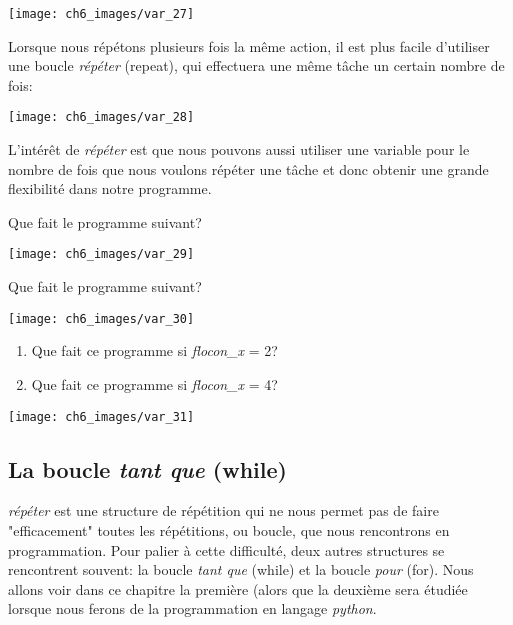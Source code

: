 \documentclass[11pt, a4paper]{book}
\begin{document}
\begin{center}
\texttt{[image: ch6\_images/var\_27]}
\end{center}

Lorsque nous répétons plusieurs fois la même action, il est plus facile d'utiliser une boucle {\it répéter} (repeat), qui effectuera une même tâche un certain nombre de fois:

\begin{center}
\texttt{[image: ch6\_images/var\_28]}
\end{center}

L'intérêt de {\it répéter} est que nous pouvons aussi utiliser une variable pour le nombre de fois que nous voulons répéter une tâche et donc obtenir une grande flexibilité dans notre programme.

\begin{exercice}
Que fait le programme suivant?
\begin{center}
\texttt{[image: ch6\_images/var\_29]}
\end{center}
\end{exercice}


\begin{exercice}
Que fait le programme suivant?
\begin{center}
\texttt{[image: ch6\_images/var\_30]}
\end{center}
\end{exercice}


\begin{exercice}
\begin{enumerate}
\item Que fait ce programme si {\it flocon\_x} = 2?
\item Que fait ce programme si {\it flocon\_x} = 4?
\end{enumerate}
\begin{center}
\texttt{[image: ch6\_images/var\_31]}
\end{center}
\end{exercice}

\subsection{La boucle {\it tant que} (while)}

{\it répéter} est une structure de répétition qui ne nous permet pas de faire "efficacement" toutes les répétitions, ou boucle, que nous rencontrons en programmation. Pour palier à cette difficulté, deux autres structures se rencontrent souvent: la boucle {\it tant que } (while) et la boucle {\it pour} (for). Nous allons voir dans ce chapitre la première (alors que la deuxième sera étudiée lorsque nous ferons de la programmation en langage {\it python}.
\end{document}
